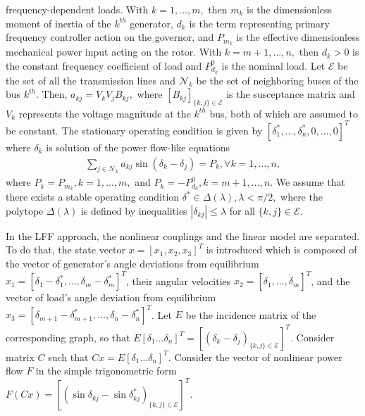\documentclass[final]{IEEEtran}
\begin{document}
frequency-dependent loads. With $k=1,...,m,$ then $m_k$ is the
dimensionless moment of inertia of the $k^{th}$ generator, $d_k$
is the term representing primary frequency controller action on
the governor, and $P_{m_k}$ is the effective dimensionless
mechanical power input acting on the rotor. With $k=m+1,...,n,$
then $d_k>0$ is the constant frequency coefficient of load and
$P^0_{d_k}$ is the nominal load. Let $\mathcal{E}$ be the set of
all the transmission lines and $\mathcal{N}_k$ be the set of
neighboring buses of the bus $k^{th}.$ Then,
$a_{kj}=V_kV_jB_{kj},$ where $[B_{kj}]_{\{k,j\} \in \mathcal{E}}$
is the  susceptance matrix and
 $V_k$ represents the voltage magnitude at the $k^{th}$ bus, both of which are assumed to be constant. The
stationary operating condition is given by
$[\delta_1^*,\dots,\delta_n^*, 0,\dots,0]^T$ where $\delta_k$ is
solution of the power flow-like equations
\begin{align}\label{eq.operatingCondition}
\sum_{j \in
  \mathcal{N}_k} a_{kj} \sin(\delta_k-\delta_j) =P_k, \forall k=1,\dots,n,
\end{align}
where $P_k=P_{m_k}, k=1,\dots,m,$ and $P_k=-P^0_{d_k},
k=m+1,\dots,n.$ We assume that there exists a stable operating
condition $\delta^* \in \Delta(\lambda), \lambda<\pi/2,$ where the
polytope $\Delta(\lambda)$ is defined by inequalities
$|\delta_{kj}|\le \lambda$ for all $\{k,j\}\in \mathcal{E}.$

In the LFF approach, the nonlinear couplings and the linear model
are separated. To do that, the state vector $x = [x_1,x_2,x_3]^T$
is introduced which is composed of the vector of generator's angle
deviations from equilibrium $x_1 = [\delta_1 - \delta_1^*,\dots,
\delta_m - \delta_m^*]^T$, their angular velocities $x_2 =
[\dot\delta_1,\dots,\dot\delta_m]^T$, and the vector of load's
angle deviation from equilibrium
$x_3=[\delta_{m+1}-\delta_{m+1}^*,\dots,\delta_n-\delta_n^*]^T$.
Let $E$ be the incidence matrix of the corresponding graph, so
that $E[\delta_1\dots\delta_n]^T =
[(\delta_k-\delta_j)_{\{k,j\}\in\mathcal{E}}]^T$. Consider matrix
$C$ such that $Cx=E[\delta_1\dots\delta_n]^T.$  Consider the
vector of nonlinear power flow $F$ in the simple trigonometric
form $
F(Cx)=[(\sin\delta_{kj}-\sin\delta^*_{kj})_{\{k,j\}\in\mathcal{E}}]^T.$
\end{document}
